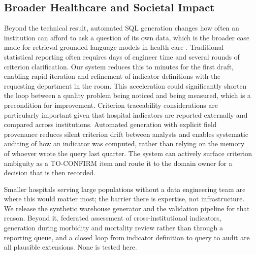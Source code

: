 \documentclass[applsci,article,submit,pdftex,oneauthor]{Definitions/mdpi}
\begin{document}
\subsection{Broader Healthcare and Societal Impact}
Beyond the technical result, automated SQL generation changes how often an institution can afford to ask a question of its own data, which is the broader case made for retrieval-grounded language models in health care \cite{ng2025}. Traditional statistical reporting often requires
days of engineer time and several rounds of criterion clarification. Our system
reduces this to minutes for the first draft, enabling rapid iteration and
refinement of indicator definitions with the requesting department in the room.
This acceleration could significantly shorten the loop between a quality problem
being noticed and being measured, which is a precondition for improvement.
Criterion traceability considerations are particularly important given that
hospital indicators are reported externally and compared across institutions.
Automated generation with explicit field provenance reduces silent
criterion drift between analysts and enables systematic auditing of how an
indicator was computed, rather than relying on the memory of whoever wrote the
query last quarter. The system can actively surface criterion ambiguity as a
TO-CONFIRM item and route it to the domain owner for a decision that is then
recorded.

Smaller hospitals serving large populations without a data engineering team are where this would matter most; the barrier there is expertise, not infrastructure. We release the synthetic warehouse generator and the validation pipeline for that reason. Beyond it, federated assessment of cross-institutional indicators, generation during morbidity and mortality review rather than through a reporting queue, and a closed loop from indicator definition to query to audit are all plausible extensions. None is tested here.
\end{document}
